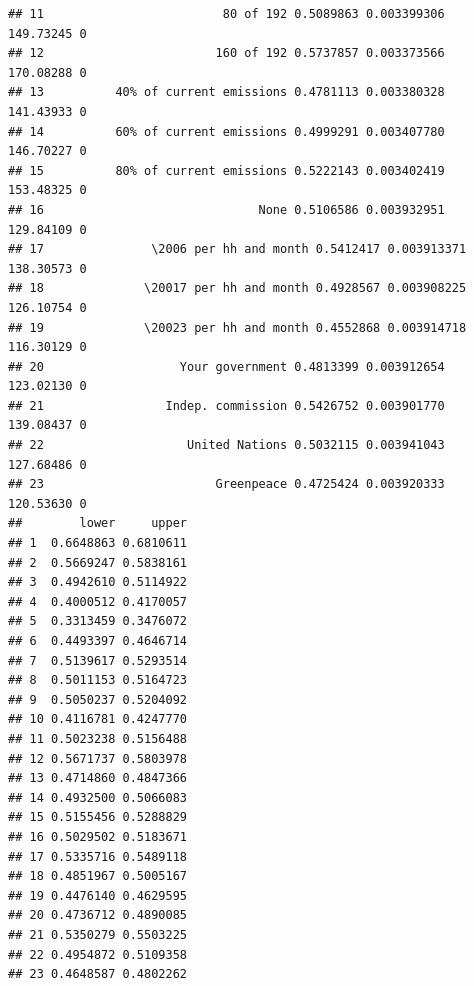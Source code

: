 \documentclass[a4paper,12pt]{article}\usepackage[]{graphicx}\usepackage[]{color}
\makeatletter
\newenvironment{kframe}{%
 \def\at@end@of@kframe{}%
 \ifinner\ifhmode%
  \def\at@end@of@kframe{\end{minipage}}%
  \begin{minipage}{\columnwidth}%
 \fi\fi%
 \def\FrameCommand##1{\hskip\@totalleftmargin \hskip-\fboxsep
 \colorbox{shadecolor}{##1}\hskip-\fboxsep
     \hskip-\linewidth \hskip-\@totalleftmargin \hskip\columnwidth}%
 \MakeFramed {\advance\hsize-\width
   \@totalleftmargin\z@ \linewidth\hsize
   \@setminipage}}%
 {\par\unskip\endMakeFramed%
 \at@end@of@kframe}
\newenvironment{knitrout}{}{} %
\makeatother
\begin{document}
\begin{knitrout}
\begin{kframe}
\begin{verbatim}
## 11                         80 of 192 0.5089863 0.003399306 149.73245 0
## 12                        160 of 192 0.5737857 0.003373566 170.08288 0
## 13          40% of current emissions 0.4781113 0.003380328 141.43933 0
## 14          60% of current emissions 0.4999291 0.003407780 146.70227 0
## 15          80% of current emissions 0.5222143 0.003402419 153.48325 0
## 16                              None 0.5106586 0.003932951 129.84109 0
## 17               \2006 per hh and month 0.5412417 0.003913371 138.30573 0
## 18              \20017 per hh and month 0.4928567 0.003908225 126.10754 0
## 19              \20023 per hh and month 0.4552868 0.003914718 116.30129 0
## 20                   Your government 0.4813399 0.003912654 123.02130 0
## 21                 Indep. commission 0.5426752 0.003901770 139.08437 0
## 22                    United Nations 0.5032115 0.003941043 127.68486 0
## 23                        Greenpeace 0.4725424 0.003920333 120.53630 0
##        lower     upper
## 1  0.6648863 0.6810611
## 2  0.5669247 0.5838161
## 3  0.4942610 0.5114922
## 4  0.4000512 0.4170057
## 5  0.3313459 0.3476072
## 6  0.4493397 0.4646714
## 7  0.5139617 0.5293514
## 8  0.5011153 0.5164723
## 9  0.5050237 0.5204092
## 10 0.4116781 0.4247770
## 11 0.5023238 0.5156488
## 12 0.5671737 0.5803978
## 13 0.4714860 0.4847366
## 14 0.4932500 0.5066083
## 15 0.5155456 0.5288829
## 16 0.5029502 0.5183671
## 17 0.5335716 0.5489118
## 18 0.4851967 0.5005167
## 19 0.4476140 0.4629595
## 20 0.4736712 0.4890085
## 21 0.5350279 0.5503225
## 22 0.4954872 0.5109358
## 23 0.4648587 0.4802262
\end{verbatim}
\end{kframe}
\end{knitrout}
\end{document}
